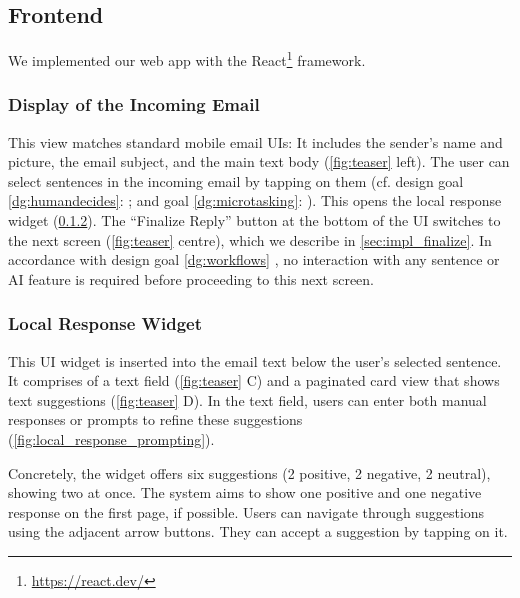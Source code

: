 \subsection{Frontend}
We implemented our web app with the React\footnote{\url{https://react.dev/}} framework.

\subsubsection{Display of the Incoming Email}
This view matches standard mobile email UIs: It includes the sender's name and picture, the email subject, and the main text body (\cref{fig:teaser} left). 
The user can select sentences in the incoming email by tapping on them (cf. design goal \ref{dg:humandecides}: ; and goal \ref{dg:microtasking}: ). This opens the local response widget (\cref{sec:impl_local_response_widget}).
The ``Finalize Reply'' button at the bottom of the UI switches to the next screen (\cref{fig:teaser} centre), which we describe in \cref{sec:impl_finalize}.
In accordance with design goal \ref{dg:workflows} , no interaction with any sentence or AI feature is required before proceeding to this next screen.



\subsubsection{Local Response Widget}\label{sec:impl_local_response_widget}

This UI widget is inserted into the email text below the user's selected sentence. It comprises of a text field (\cref{fig:teaser} C) and a paginated card view that shows text suggestions (\cref{fig:teaser} D). In the text field, users can enter both manual responses or prompts to refine these suggestions (\cref{fig:local_response_prompting}). 

Concretely, the widget offers six suggestions (2 positive, 2 negative, 2 neutral), showing two at once. The system aims to show one positive and one negative response on the first page, if possible.   %
Users can navigate through suggestions using the adjacent arrow buttons. They can accept a suggestion by tapping on it.

